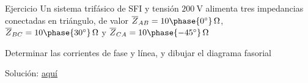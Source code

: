 \documentclass[aspectratio=169, usenames,svgnames,dvipsnames]{beamer}
\begin{document}

\begin{frame}{Ejercicio}
    \vspace{19mm}
    Un sistema trifásico de SFI y tensión $\qty{200}{\volt}$ alimenta tres impedancias conectadas en triángulo, de valor $\overline{Z}_{AB}=10\phase{0^\circ}\,\Omega$, $\overline{Z}_{BC}=10\phase{30^\circ}\,\Omega$ y $\overline{Z}_{CA}=10\phase{-45^\circ}\,\Omega$  

    \vspace{5mm}
    Determinar las corrientes de fase y línea, y dibujar el diagrama fasorial

    \vspace{28mm}
    \alert{Solución}: \href{https://raw.githubusercontent.com/ETSIDI-IE/tc/master/docs/ejercicios_clase/TC1_03_Ejemplo_3_4_libro_LBB.pdf}{aquí}
\end{frame}

\end{document}

